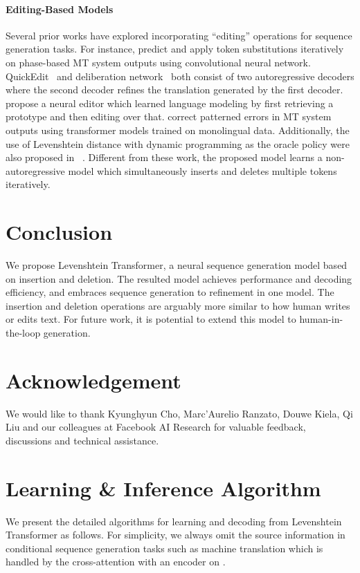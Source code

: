 \documentclass{article}
\begin{document}
\paragraph{Editing-Based Models} 
Several prior works have explored incorporating ``editing'' operations for sequence generation tasks. For instance,
\cite{novak2016iterative} predict and apply token substitutions iteratively on phase-based MT system outputs using convolutional neural network. QuickEdit~\citep{grangier2017quickedit} and deliberation network~\citep{xia2017deliberation} both consist of two autoregressive decoders where the second decoder refines the translation generated by the first decoder. \citet{guu2018generating} propose a neural editor which learned language modeling by first retrieving a prototype and then editing over that. \cite{freitag2019text} correct patterned errors in MT system outputs using transformer models trained on monolingual data.
Additionally, the use of Levenshtein distance with dynamic programming as the oracle policy were also proposed in ~\citet{sabour2018optimal,dong2019editnts}. Different from these work, the proposed model learns a non-autoregressive model which simultaneously inserts and deletes multiple tokens iteratively.


\section{Conclusion}
We propose Levenshtein Transformer, a neural sequence generation model based on insertion and deletion. The resulted model achieves performance and decoding efficiency, and embraces sequence generation to refinement in one model. 
The insertion and deletion operations are arguably more similar to how human writes or edits text. For future work, it is potential to extend this model to human-in-the-loop generation.

\section*{Acknowledgement}
We would like to thank Kyunghyun Cho, Marc'Aurelio Ranzato, Douwe Kiela, Qi Liu and our colleagues at Facebook AI Research for valuable feedback, discussions and technical assistance.



\newpage
\appendix
\section{Learning \& Inference Algorithm}
We present the detailed algorithms for learning and decoding from Levenshtein Transformer as follows. For simplicity, we always omit the source information  in conditional sequence generation tasks such as machine translation which is handled by the cross-attention with an encoder on .
\end{document}
